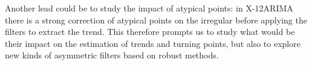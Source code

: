 \documentclass[
  12pt,
  ,
  a4paper]{article}
\newcommand\1{\mathds{1}}
\begin{document}
Another lead could be to study the impact of atypical points: in X-12ARIMA there is a strong correction of atypical points on the irregular before applying the filters to extract the trend.
This therefore prompts us to study what would be their impact on the estimation of trends and turning points, but also to explore new kinds of asymmetric filters based on robust methods.

\newpage

\printbibliography[title=References]
\end{document}
